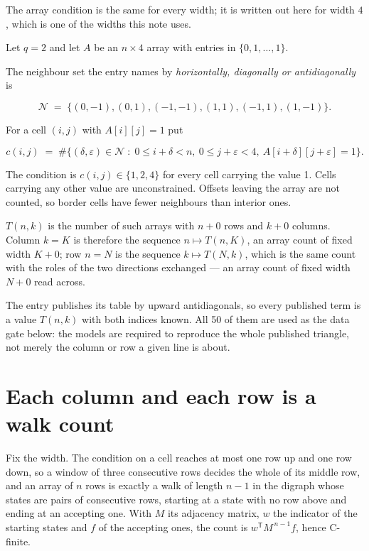 \documentclass[11pt]{article}
\theoremstyle{definition}
\begin{document}
The array condition is the same for every width; it is written out here for width $4$, which is one of the widths this note uses.

Let $q = 2$ and let $A$ be an $n \times 4$ array with entries in $\{0,1,\dots,1\}$.

The neighbour set the entry names by {\itshape horizontally, diagonally or antidiagonally} is

\[\mathcal{N} \;=\; \{(0,-1), (0,1), (-1,-1), (1,1), (-1,1), (1,-1)\}.\]

For a cell $(i,j)$ with $A[i][j] = 1$ put

\[c(i,j) \;=\; \#\bigl\{(\delta,\varepsilon)\in\mathcal{N} \;:\; 0\le i+\delta<n,\ 0\le j+\varepsilon<4,\ A[i+\delta][j+\varepsilon] = 1\bigr\}.\]

The condition is $c(i,j) \in \{1, 2, 4\}$ for every cell carrying the value 1. Cells carrying any other value are unconstrained. Offsets leaving the array are not counted, so border cells have fewer neighbours than interior ones.

$T(n,k)$ is the number of such arrays with $n + 0$ rows and $k + 0$ columns. Column $k = K$ is therefore the sequence $n \mapsto T(n,K)$, an array count of fixed width $K + 0$; row $n = N$ is the sequence $k \mapsto T(N,k)$, which is the same count with the roles of the two directions exchanged --- an array count of fixed width $N + 0$ read across.

The entry publishes its table by upward antidiagonals, so every published term is a value $T(n,k)$ with both indices known. All 50 of them are used as the data gate below: the models are required to reproduce the whole published triangle, not merely the column or row a given line is about.

\section{Each column and each row is a walk count}

Fix the width. The condition on a cell reaches at most one row up and one row down, so a window of three consecutive rows decides the whole of its middle row, and an array of $n$ rows is exactly a walk of length $n-1$ in the digraph whose states are pairs of consecutive rows, starting at a state with no row above and ending at an accepting one. With $M$ its adjacency matrix, $w$ the indicator of the starting states and $f$ of the accepting ones, the count is $w^{\mathsf T}M^{\,n-1}f$, hence C-finite.
\end{document}
